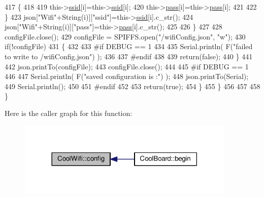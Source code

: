 \begin{DoxyCode}
417                 \{
418                     
419                     this->\hyperlink{classCoolWifi_a893b21d0fed821438733bba2e73fb4c2}{ssid}[i]=this->\hyperlink{classCoolWifi_a893b21d0fed821438733bba2e73fb4c2}{ssid}[i];
420                     this->\hyperlink{classCoolWifi_a0c3332a149245aaad060b32593a54c9b}{pass}[i]=this->\hyperlink{classCoolWifi_a0c3332a149245aaad060b32593a54c9b}{pass}[i];                    
421                     
422                 \}
423                 json[\textcolor{stringliteral}{"Wifi"}+String(i)][\textcolor{stringliteral}{"ssid"}]=this->\hyperlink{classCoolWifi_a893b21d0fed821438733bba2e73fb4c2}{ssid}[i].c\_str();
424                 json[\textcolor{stringliteral}{"Wifi"}+String(i)][\textcolor{stringliteral}{"pass"}]=this->\hyperlink{classCoolWifi_a0c3332a149245aaad060b32593a54c9b}{pass}[i].c\_str();           
425                         
426             \}
427 
428             configFile.close();
429             configFile = SPIFFS.open(\textcolor{stringliteral}{"/wifiConfig.json"}, \textcolor{stringliteral}{"w"});
430             \textcolor{keywordflow}{if}(!configFile)
431             \{
432             
433 \textcolor{preprocessor}{            #if DEBUG == 1 }
434 
435                 Serial.println( F(\textcolor{stringliteral}{"failed to write to /wifiConfig.json"}) );
436             
437 \textcolor{preprocessor}{            #endif}
438 
439                 \textcolor{keywordflow}{return}(\textcolor{keyword}{false});              
440             \}
441             
442             json.printTo(configFile);
443             configFile.close();
444 
445 \textcolor{preprocessor}{        #if DEBUG == 1 }
446 
447             Serial.println( F(\textcolor{stringliteral}{"saved configuration is :"}) );
448             json.printTo(Serial);
449             Serial.println();
450         
451 \textcolor{preprocessor}{        #endif}
452 
453             \textcolor{keywordflow}{return}(\textcolor{keyword}{true}); 
454         \}
455     \}   
456     
457 
458 \}
\end{DoxyCode}
Here is the caller graph for this function\+:
\nopagebreak
\begin{figure}[H]
\begin{center}
\leavevmode
\includegraphics[width=294pt]{classCoolWifi_a4eb2f6b9b09dd588964b88b6c70122c0_icgraph}
\end{center}
\end{figure}
\mbox{\label{classCoolWifi_a2a9a546f76816c8c5c8e2d46a6c4f07d}} 
